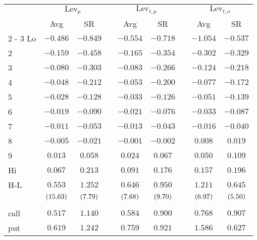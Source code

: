 \begin{tabular}{@{}lcccccccc@{}}%
\toprule%
&\multicolumn{2}{c}{$\text{Lev}_p$}&&\multicolumn{2}{c}{$\text{Lev}_{t,p}$}&&\multicolumn{2}{c}{$\text{Lev}_{t,o}$}\\%
\multicolumn{1}{c}{}&\multicolumn{1}{c}{Avg}&\multicolumn{1}{c}{SR}&\multicolumn{1}{c}{}&\multicolumn{1}{c}{Avg}&\multicolumn{1}{c}{SR}&\multicolumn{1}{c}{}&\multicolumn{1}{c}{Avg}&\multicolumn{1}{c}{SR}\\%
\cmidrule{2%
-%
3}%
\cmidrule{5%
-%
6}%
\cmidrule{8%
-%
9}%
Lo&$-0.486$&$-0.849$&&$-0.554$&$-0.718$&&$-1.054$&$-0.537$\\%
2&$-0.159$&$-0.458$&&$-0.165$&$-0.354$&&$-0.302$&$-0.329$\\%
3&$-0.080$&$-0.303$&&$-0.083$&$-0.266$&&$-0.124$&$-0.218$\\%
4&$-0.048$&$-0.212$&&$-0.053$&$-0.200$&&$-0.077$&$-0.172$\\%
5&$-0.028$&$-0.128$&&$-0.033$&$-0.126$&&$-0.051$&$-0.139$\\%
6&$-0.019$&$-0.090$&&$-0.021$&$-0.076$&&$-0.033$&$-0.087$\\%
7&$-0.011$&$-0.053$&&$-0.013$&$-0.043$&&$-0.016$&$-0.040$\\%
8&$-0.005$&$-0.021$&&$-0.001$&$-0.002$&&$0.008$&$0.019$\\%
9&$0.013$&$0.058$&&$0.024$&$0.067$&&$0.050$&$0.109$\\%
Hi&$0.067$&$0.213$&&$0.091$&$0.176$&&$0.157$&$0.196$\\%
\midrule%
H{-}L&$0.553$&$1.252$&&$0.646$&$0.950$&&$1.211$&$0.645$\\%
&$\footnotesize{(15.63)}$&$\footnotesize{(7.79)}$&&$\footnotesize{(7.68)}$&$\footnotesize{(9.70)}$&&$\footnotesize{(6.97)}$&$\footnotesize{(5.50)}$\\%
&&&&&&&&\\%
call&$0.517$&$1.140$&&$0.584$&$0.900$&&$0.768$&$0.907$\\%
put&$0.619$&$1.242$&&$0.759$&$0.921$&&$1.586$&$0.627$\\\bottomrule%
%
\end{tabular}